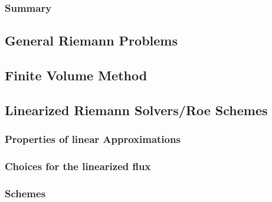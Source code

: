 \documentclass[
  fourColumns,
  landscape
]{formularyETH/formularyETH}
\begin{document}
      \subsubsection{Summary}
        
      \subsection{General Riemann Problems}\label{subsec:general_riemann_problems}
        
\vfill\columnbreak
  \subsection*{Finite Volume Method}
  
  \subsection{Linearized Riemann Solvers/Roe Schemes}
      
      \subsubsection{Properties of linear Approximations}\label{subsubsubsec:properties}
        
      \subsubsection{Choices for the linearized flux}
      \label{subsubsubsec:arithmetic_average}
        
      \label{subsubsubsec:roe_matrices}
        
      \subsubsection{Schemes}\label{subsubsec:schemes}
        
      \label{subsubsubsec:harten's_entropy_fix}
        
\end{document}
